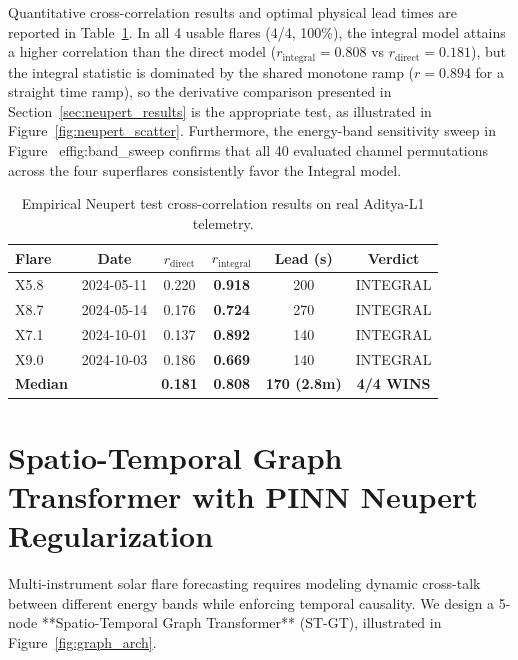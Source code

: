 \documentclass[11pt,a4paper,twocolumn]{article}
\newcommand{\rint}{0.808}
\newcommand{\rdir}{0.181}
\newcommand{\rintramp}{0.894}
\begin{document}
Quantitative cross-correlation results and optimal physical lead times are reported in Table~\ref{tab:neupert_results}. In all 4 usable flares (4/4, 100\%), the integral model attains a higher correlation than the direct model ($r_{\text{integral}} = \rint$ vs $r_{\text{direct}} = \rdir$), but the integral statistic is dominated by the shared monotone ramp ($r = \rintramp$ for a straight time ramp), so the derivative comparison presented in Section~\ref{sec:neupert_results} is the appropriate test, as illustrated in Figure~\ref{fig:neupert_scatter}. Furthermore, the energy-band sensitivity sweep in Figure~
ef{fig:band_sweep} confirms that all 40 evaluated channel permutations across the four superflares consistently favor the Integral model.

\begin{table}[htbp]
\centering
\caption{Empirical Neupert test cross-correlation results on real Aditya-L1 telemetry.}
\label{tab:neupert_results}
\small
\begin{tabular}{lccccc}
\toprule
Flare & Date & $r_{\text{direct}}$ & $r_{\text{integral}}$ & Lead (s) & Verdict \\
\midrule
X5.8 & 2024-05-11 & 0.220 & \textbf{0.918} & 200 & INTEGRAL \\
X8.7 & 2024-05-14 & 0.176 & \textbf{0.724} & 270 & INTEGRAL \\
X7.1 & 2024-10-01 & 0.137 & \textbf{0.892} & 140 & INTEGRAL \\
X9.0 & 2024-10-03 & 0.186 & \textbf{0.669} & 140 & INTEGRAL \\
\midrule
\textbf{Median} & & \textbf{0.181} & \textbf{0.808} & \textbf{170 (2.8m)} & \textbf{4/4 WINS} \\
\bottomrule
\end{tabular}
\end{table}

\section{Spatio-Temporal Graph Transformer with PINN Neupert Regularization}
\label{sec:architecture}

Multi-instrument solar flare forecasting requires modeling dynamic cross-talk between different energy bands while enforcing temporal causality. We design a 5-node **Spatio-Temporal Graph Transformer** (ST-GT), illustrated in Figure~\ref{fig:graph_arch}.
\end{document}

